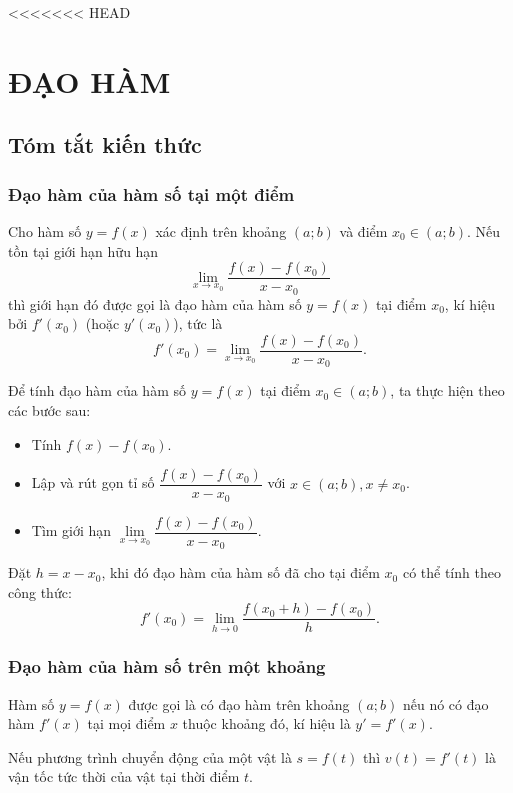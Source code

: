 <<<<<<< HEAD
\setcounter{section}{30}
\section{ĐẠO HÀM}
\subsection{Tóm tắt kiến thức}
\begin{tomtat}
	\subsubsection{Đạo hàm của hàm số tại một điểm}
	\begin{dn}
	Cho hàm số $y=f(x)$ xác định trên khoảng $(a;b)$ và điểm $x_0 \in (a;b)$.
	Nếu tồn tại giới hạn hữu hạn 
	\[\lim\limits_{x \to x_0} \dfrac{f(x)-f(x_0)}{x-x_0}\]
	thì giới hạn đó được gọi là đạo hàm của hàm số $y=f(x)$ tại điểm $x_0$, kí hiệu bởi $f'(x_0)$ (hoặc $y'(x_0)$), tức là 
	\[f'(x_0)=\lim\limits_{x \to x_0} \dfrac{f(x)-f(x_0)}{x-x_0}.\]
	\end{dn}
	\begin{note}
	Để tính đạo hàm của hàm số $y=f(x)$ tại điểm $x_0\in (a;b)$, ta thực hiện theo các bước sau:
	\begin{itemize}
	\item Tính $f(x)-f(x_0)$.
	\item Lập và rút gọn tỉ số $\dfrac{f(x)-f(x_0)}{x-x_0}$ với $x \in (a;b),x \ne x_0$.
	\item Tìm giới hạn $\lim\limits_{x \to x_0} \dfrac{f(x)-f(x_0)}{x-x_0}$.
	\end{itemize}
	\end{note}
	\begin{note}
	Đặt $h=x-x_0$, khi đó đạo hàm của hàm số đã cho tại điểm $x_0$ có thể tính theo công thức:\\
	$$f'(x_0)=\lim\limits_{h \to 0} \dfrac{f(x_0+h)-f(x_0)}{h}.$$
	\end{note}
	\subsubsection{Đạo hàm của hàm số trên một khoảng}
	\begin{dn}
	Hàm số $y=f(x)$ được gọi là có đạo hàm trên khoảng $(a;b)$ nếu nó có đạo hàm $f'(x)$ tại mọi điểm $x$ thuộc khoảng đó, kí hiệu là $y'=f'(x)$.
	\end{dn}	
	\begin{note}
	Nếu phương trình chuyển động của một vật là $s=f(t)$ thì $v(t)=f'(t)$ là vận tốc tức thời của vật tại thời điểm $t$.
	\end{note}

\end{tomtat}
